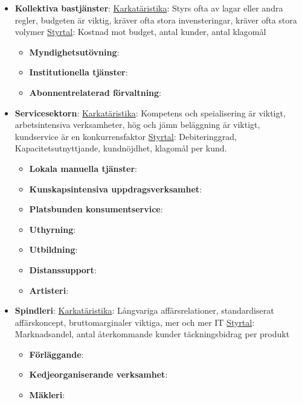 \documentclass{article}
\begin{document}
\begin{itemize}
\begin{itemize}
    \end{itemize}
    \item \textbf{Kollektiva bastjänster}:
    \underline{Karkatäristika}: \newline
    Styrs ofta av lagar eller andra regler, budgeten är viktig, kräver ofta stora invensteringar, kräver ofta stora volymer \newline
    \underline{Styrtal}: \newline
    Kostnad mot budget, antal kunder, antal klagomål
    \begin{itemize}
        \item \textbf{Myndighetsutövning}:
        \item \textbf{Institutionella tjänster}:
        \item \textbf{Abonnentrelaterad förvaltning}:
    \end{itemize}
    \item \textbf{Servicesektorn}:
    \underline{Karkatäristika}: \newline
    Kompetens och speialisering är viktigt, arbetsintensiva verksamheter, hög och jämn beläggning är viktigt, kundservice är en konkurrensfaktor \newline
    \underline{Styrtal}: \newline
    Debiteringgrad, Kapacitetsutnyttjande, kundnöjdhet, klagomål per kund.
    \begin{itemize}
        \item \textbf{Lokala manuella tjänster}:
        \item \textbf{Kunskapsintensiva uppdragsverksamhet}:
        \item \textbf{Platsbunden konsumentservice}:
        \item \textbf{Uthyrning}:
        \item \textbf{Utbildning}:
        \item \textbf{Distanssupport}:
        \item \textbf{Artisteri}:
    \end{itemize}
    \item \textbf{Spindleri}:
    \underline{Karkatäristika}: \newline
    Långvariga affärsrelationer, standardiserat affärskoncept, bruttomarginaler viktiga, mer och mer IT \newline
    \underline{Styrtal}: \newline
    Marknadsandel, antal återkommande kunder täckningsbidrag per produkt
    \begin{itemize}
        \item \textbf{Förläggande}:
        \item \textbf{Kedjeorganiserande verksamhet}:
        \item \textbf{Mäkleri}:
    \end{itemize}
\end{itemize}
\end{document}
